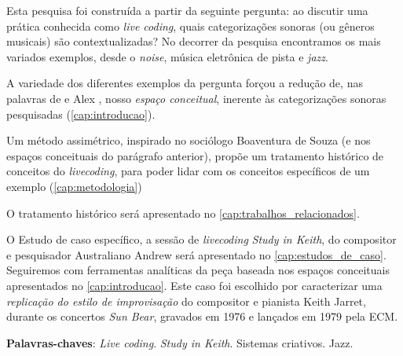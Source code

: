 \setlength{\absparsep}{18pt} %
\begin{resumo}
Esta pesquisa foi construída a partir da seguinte pergunta: ao discutir uma prática conhecida como \textit{live coding}, quais categorizações sonoras (ou gêneros musicais) são contextualizadas? No decorrer da pesquisa encontramos os mais variados exemplos, desde o \emph{noise}, música eletrônica de pista e \emph{jazz}.

A variedade dos diferentes exemplos da pergunta forçou a redução de, nas palavras de  e Alex , nosso \emph{espaço conceitual}, inerente às categorizações sonoras pesquisadas (\autoref{cap:introducao}).

Um método assimétrico, inspirado no sociólogo Boaventura de Souza  (e nos espaços conceituais do parágrafo anterior), propõe um tratamento histórico de conceitos do \emph{livecoding}, para poder lidar com os conceitos específicos de um exemplo (\autoref{cap:metodologia})

O tratamento histórico será apresentado no \autoref{cap:trabalhos_relacionados}.

O Estudo de caso específico, a sessão de \emph{livecoding} \emph{Study in Keith}, do compositor e pesquisador Australiano Andrew  será apresentado no \autoref{cap:estudos_de_caso}. Seguiremos com ferramentas analíticas da peça baseada nos espaços conceituais apresentados no \autoref{cap:introducao}. Este caso foi escolhido por caracterizar uma \emph{replicação do estilo de improvisação} do compositor e pianista Keith Jarret, durante os concertos \emph{Sun Bear}, gravados em 1976 e lançados em 1979 pela ECM.


\vspace{\onelineskip}
\noindent
\textbf{Palavras-chaves}: \textit{Live coding}. \emph{Study in Keith}. Sistemas criativos. Jazz.
\end{resumo}

